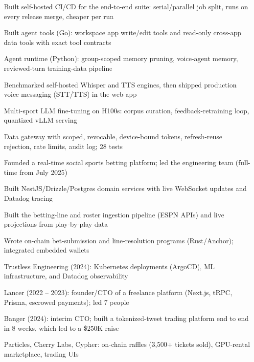 \documentclass[print]{jack-resume}
\begin{document}
\begin{tightemize}
    \item Built self-hosted CI/CD for the end-to-end suite: serial/parallel job split, runs on every release merge, cheaper per run
    \item Built agent tools (Go): workspace app write/edit tools and read-only cross-app data tools with exact tool contracts
    \item Agent runtime (Python): group-scoped memory pruning, voice-agent memory, reviewed-turn training-data pipeline
    \item Benchmarked self-hosted Whisper and TTS engines, then shipped production voice messaging (STT/TTS) in the web app
    \item Multi-sport LLM fine-tuning on H100s: corpus curation, feedback-retraining loop, quantized vLLM serving
    \item Data gateway with scoped, revocable, device-bound tokens, refresh-reuse rejection, rate limits, audit log; 28 tests
\end{tightemize}
\sectionsep

\begin{tightemize}
    \item Founded a real-time social sports betting platform; led the engineering team (full-time from July 2025)
    \item Built NestJS/Drizzle/Postgres domain services with live WebSocket updates and Datadog tracing
    \item Built the betting-line and roster ingestion pipeline (ESPN APIs) and live projections from play-by-play data
    \item Wrote on-chain bet-submission and line-resolution programs (Rust/Anchor); integrated embedded wallets
\end{tightemize}
\sectionsep

\begin{tightemize}
    \item Trustless Engineering (2024): Kubernetes deployments (ArgoCD), ML infrastructure, and Datadog observability
    \item Lancer (2022 – 2023): founder/CTO of a freelance platform (Next.js, tRPC, Prisma, escrowed payments); led 7 people
    \item Banger (2024): interim CTO; built a tokenized-tweet trading platform end to end in 8 weeks, which led to a \$250K raise
    \item Particles, Cherry Labs, Cypher: on-chain raffles (3,500+ tickets sold), GPU-rental marketplace, trading UIs
\end{tightemize}
\sectionsep
\end{document}
